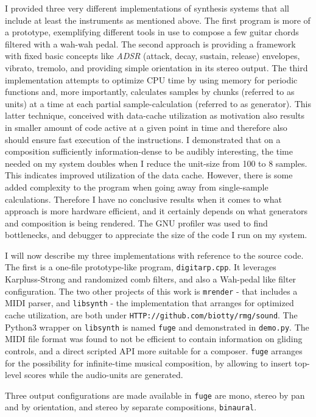 \documentclass{article}
\begin{document}
I provided three very different implementations of synthesis systems
that all include at least the instruments as mentioned above.
The first program is more of a prototype, exemplifying different tools in use
to compose a few guitar chords filtered with a wah-wah pedal.
The second approach is providing a framework with fixed basic concepts
like \textit{ADSR} (attack, decay, sustain, release)
envelopes, vibrato, tremolo, and providing simple orientation
in its stereo output.
The third implementation attempts to optimize CPU time by
using memory for periodic functions and, more importantly,
calculates samples by chunks (referred to as units) at a time at each
partial sample-calculation (referred to as generator).
This latter technique, conceived with data-cache utilization as
motivation also results in smaller amount of code active at a given
point in time and therefore also should ensure fast execution of
the instructions.
I demonstrated that on a composition sufficiently information-dense to be audibly
interesting, the time needed on my system doubles when I reduce the unit-size
from 100 to 8 samples.
This indicates improved utilization of the data cache.
However, there is some added complexity to the program when going away
from single-sample calculations.
Therefore I have no conclusive results when it comes to what approach
is more hardware efficient, and it certainly depends on what generators
and composition is being rendered.
The GNU profiler was used to find bottlenecks, and debugger to appreciate
the size of the code I run on my system.

I will now describe my three implementations with reference
to the source code.  The first is a one-file prototype-like program,
\texttt{digitarp.cpp}.  It leverages Karpluss-Strong and randomized
comb filters, and also a Wah-pedal like filter configuration.
The two other projects of this work is \texttt{mrender} - that includes a
MIDI parser, and \texttt{libsynth} - the implementation that arranges for
optimized cache utilization, are both under
\texttt{HTTP://github.com/biotty/rmg/sound}.
The Python3 wrapper on \texttt{libsynth} is named \texttt{fuge} and demonstrated
in \texttt{demo.py}.
The MIDI file format was found to not be efficient to contain information
on gliding controls, and a direct scripted API more suitable for a composer.
\texttt{fuge} arranges for the possibility for infinite-time musical composition,
by allowing to insert top-level scores while the audio-units are generated.

Three output configurations are made available in \texttt{fuge} are mono,
stereo by pan and by orientation, and stereo by separate compositions,
\verb|binaural|.
\end{document}
